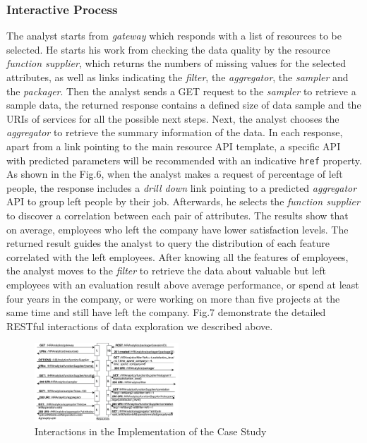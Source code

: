 \documentclass[10pt, conference, compsocconf]{IEEEtran}
\begin{document}
\subsubsection{Interactive Process}
The analyst starts from \textit{gateway} which responds with a list of resources to be selected. He starts his work from checking the data quality by the resource \textit{function supplier}, which returns the numbers of missing values for the selected attributes,  as well as links indicating the \textit{filter}, the \textit{aggregator}, the \textit{sampler} and the \textit{packager}. Then the analyst sends a GET request to the \textit{sampler} to retrieve a sample data, the returned response contains a defined size of data sample and the URIs of services for all the possible next steps. Next, the analyst chooses the \textit{aggregator} to retrieve the summary information of the data. In each response, apart from a link pointing to the main resource API template, a specific API with predicted parameters will be recommended with an indicative \texttt{href} property. As shown in the Fig.6, when the analyst makes a request of percentage of left people, the response includes a \textit{drill down} link pointing to a predicted \textit{aggregator} API to group left people by their job. Afterwards, he selects the \textit{function supplier} to discover a correlation between each pair of attributes. The results show that on average, employees who left the company have lower satisfaction levels. The returned result guides the analyst to query the distribution of each feature correlated with the left employees. After knowing all the features of employees, the analyst moves to the \textit{filter} to retrieve the data about valuable but left employees with an evaluation result above average performance, or spend at least four years in the company, or were working on more than five projects at the same time and still have left the company. Fig.7 demonstrate the detailed RESTful interactions of data exploration we described above.
\begin{figure}[h]
	\centering
	\includegraphics[width=0.48\textwidth]{CaseStudyInteractive}
	\caption{Interactions in the Implementation of the Case Study}
	\label{fig.7}
\end{figure}
\end{document}
